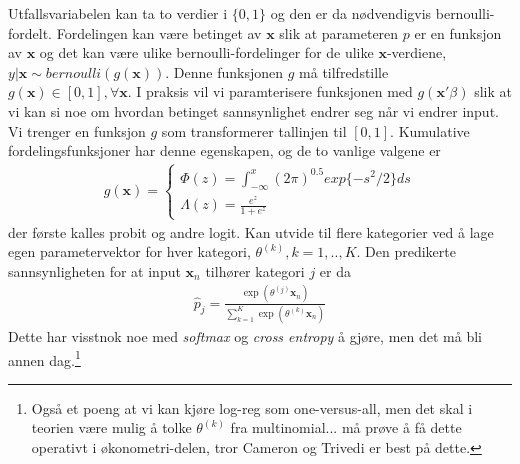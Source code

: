 Utfallsvariabelen kan ta to verdier i $\{0,1\}$ og den er da nødvendigvis bernoulli-fordelt. Fordelingen kan være betinget av $\mathbf{x}$ slik at parameteren $p$ er en funksjon av $\mathbf{x}$ og det kan være ulike bernoulli-fordelinger for de ulike $\mathbf{x}$-verdiene, $y|\mathbf{x} \sim bernoulli(g(\mathbf{x}))$. Denne funksjonen $g$ må tilfredstille $g(\mathbf{x}) \in [0,1], \forall \mathbf{x}$. I praksis vil vi paramterisere funksjonen med $g({\mathbf{x}}'\beta)$ slik at vi kan si noe om hvordan betinget sannsynlighet endrer seg når vi endrer input. Vi trenger en funksjon $g$ som transformerer tallinjen til $[0,1]$. Kumulative fordelingsfunksjoner har denne egenskapen, og de to vanlige valgene er 
\begin{align}
g(\mathbf{x}) = 
\begin{cases} \Phi(z) = \int_{-\infty}^x (2\pi)^{0.5}exp\{-s^2/2\}ds \\
\Lambda(z) = \frac{e^z}{1+e^z}
\end{cases}
\end{align}
der første kalles probit og andre logit. Kan utvide til flere kategorier ved å lage egen parametervektor for hver kategori, $\theta^{(k)}, k=1,..,K$. Den predikerte sannsynligheten for at input $\mathbf{x}_n$ tilhører kategori $j$ er da
\begin{align}
\hat{p}_j = \frac{\exp\left(\theta^{(j)}\mathbf{x}_n\right)}{\sum_{k=1}^K \exp\left(\theta^{(k)}\mathbf{x}_n\right)}
\end{align}
Dette har visstnok noe med \textit{softmax} og \textit{cross entropy} å gjøre, men det må bli annen dag.\footnote{Også et poeng at vi kan kjøre log-reg som one-versus-all, men det skal i teorien være mulig å tolke $\theta^{(k)}$ fra multinomial... må prøve å få dette operativt i økonometri-delen, tror Cameron og Trivedi er best på dette.}
